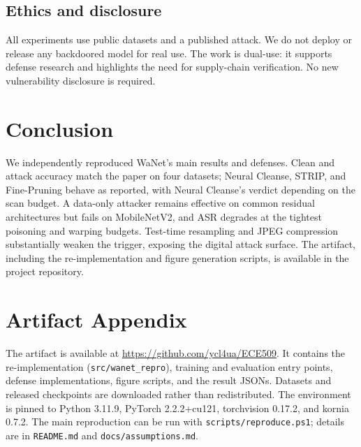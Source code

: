 \documentclass[conference]{IEEEtran}
\begin{document}
\subsection{Ethics and disclosure}
All experiments use public datasets and a published attack. We do not deploy
or release any backdoored model for real use. The work is dual-use: it
supports defense research and highlights the need for supply-chain
verification. No new vulnerability disclosure is required.

\section{Conclusion}
We independently reproduced WaNet's main results and defenses. Clean and
attack accuracy match the paper on four datasets; Neural Cleanse, STRIP, and
Fine-Pruning behave as reported, with Neural Cleanse's verdict depending on
the scan budget. A data-only attacker remains effective on common residual
architectures but fails on MobileNetV2, and ASR degrades at the tightest
poisoning and warping budgets. Test-time resampling and JPEG compression
substantially weaken the trigger, exposing the digital attack surface. The artifact,
including the re-implementation and figure generation scripts, is available in
the project repository.

\section*{Artifact Appendix}
The artifact is available at \url{https://github.com/ycl4ua/ECE509}. It
contains the re-implementation (\texttt{src/wanet\_repro}), training and
evaluation entry points, defense implementations, figure scripts, and the
result JSONs. Datasets and released checkpoints are downloaded rather than
redistributed. The environment is pinned to Python 3.11.9, PyTorch
2.2.2+cu121, torchvision 0.17.2, and kornia 0.7.2. The main reproduction can
be run with \texttt{scripts/reproduce.ps1}; details are in \texttt{README.md}
and \texttt{docs/assumptions.md}.



\end{document}
